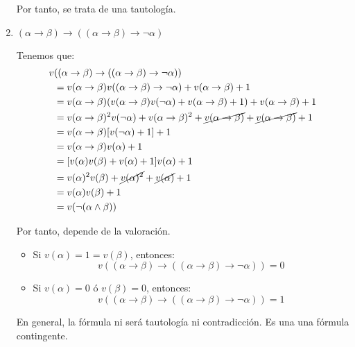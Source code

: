 \begin{ejercicio}
\begin{enumerate}
        Por tanto, se trata de una tautología.
        
        \item $(\alpha\rightarrow\beta)\rightarrow((\alpha\rightarrow\beta)\rightarrow\lnot\alpha)$
        
        Tenemos que:
        \begin{align*}
            v&((\alpha\rightarrow\beta)\rightarrow((\alpha\rightarrow\beta)\rightarrow\lnot\alpha))\\
            &= v(\alpha\rightarrow\beta)v((\alpha\rightarrow\beta)\rightarrow\lnot\alpha)+v(\alpha\rightarrow\beta)+1\\
            &= v(\alpha\rightarrow\beta)(v(\alpha\rightarrow\beta)v(\lnot\alpha)+v(\alpha\rightarrow\beta)+1)+v(\alpha\rightarrow\beta)+1\\
            &= v(\alpha\rightarrow\beta)^2v(\lnot\alpha)+v(\alpha\rightarrow\beta)^2+\cancel{v(\alpha\rightarrow\beta)}+\cancel{v(\alpha\rightarrow\beta)}+1\\
            &= v(\alpha\rightarrow\beta)[v(\lnot \alpha)+1] +1\\
            &= v(\alpha\rightarrow\beta)v(\alpha)+1\\
            &= [v(\alpha)v(\beta) + v(\alpha) +1]v(\alpha) +1\\
            &= v(\alpha)^2v(\beta)+ \cancel{v(\alpha)^2} + \cancel{v(\alpha)} + 1\\
            &= v(\alpha)v(\beta) + 1\\
            &= v(\lnot(\alpha\land \beta))
        \end{align*}

        Por tanto, depende de la valoración.
        \begin{itemize}
            \item Si $v(\alpha)=1=v(\beta)$, entonces:
                \begin{equation*}
                    v((\alpha\rightarrow\beta)\rightarrow((\alpha\rightarrow\beta)\rightarrow\lnot\alpha))=0
                \end{equation*}
            \item Si $v(\alpha)=0$ ó $v(\beta)=0$, entonces:
                \begin{equation*}
                    v((\alpha\rightarrow\beta)\rightarrow((\alpha\rightarrow\beta)\rightarrow\lnot\alpha))=1
                \end{equation*}
        \end{itemize}
        En general, la fórmula ni será tautología ni contradicción. Es una una fórmula contingente.


\end{enumerate}
\end{ejercicio}
